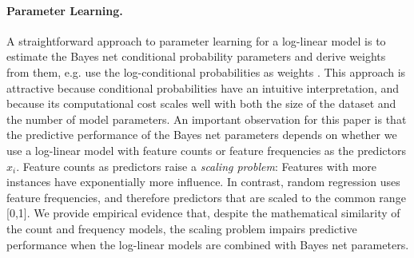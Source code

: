 \documentclass[twoside,leqno,twocolumn]{article}
\begin{document}
\paragraph{Parameter Learning.} A straightforward approach to parameter learning for a log-linear model is to estimate the Bayes net conditional probability parameters and derive weights from them, e.g. use the log-conditional probabilities as weights \cite{Domingos2007}. This approach is attractive because conditional probabilities have an intuitive interpretation, and because its computational cost scales well with  both  the size of the dataset and the number of model parameters. An important observation for this paper is that the predictive performance of the Bayes net parameters depends on whether we use a log-linear model with feature counts or feature frequencies as the predictors $x_{i}$. Feature counts as predictors raise a 
{\em scaling problem}: Features with more instances have exponentially more influence. 
In contrast, random regression uses feature frequencies, and therefore predictors that are scaled to the common range [0,1]. We provide empirical evidence that, despite the mathematical similarity of the count and frequency models, the scaling problem impairs predictive performance when the log-linear models are combined with Bayes net parameters.
\end{document}
